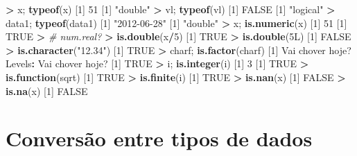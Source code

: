 \documentclass[]{book}
\newenvironment{Shaded}{\begin{snugshade}}{\end{snugshade}}
\newcommand{\KeywordTok}[1]{\textcolor[rgb]{0.13,0.29,0.53}{\textbf{#1}}}
\newcommand{\DecValTok}[1]{\textcolor[rgb]{0.00,0.00,0.81}{#1}}
\newcommand{\StringTok}[1]{\textcolor[rgb]{0.31,0.60,0.02}{#1}}
\newcommand{\CommentTok}[1]{\textcolor[rgb]{0.56,0.35,0.01}{\textit{#1}}}
\newcommand{\OtherTok}[1]{\textcolor[rgb]{0.56,0.35,0.01}{#1}}
\newcommand{\OperatorTok}[1]{\textcolor[rgb]{0.81,0.36,0.00}{\textbf{#1}}}
\newcommand{\ErrorTok}[1]{\textcolor[rgb]{0.64,0.00,0.00}{\textbf{#1}}}
\newcommand{\NormalTok}[1]{#1}
\begin{document}
\begin{Shaded}
\begin{Highlighting}[]
\OperatorTok{>}\StringTok{ }\NormalTok{x; }\KeywordTok{typeof}\NormalTok{(x)}
\NormalTok{[}\DecValTok{1}\NormalTok{] }\DecValTok{51}
\NormalTok{[}\DecValTok{1}\NormalTok{] }\StringTok{"double"}
\OperatorTok{>}\StringTok{ }\NormalTok{vl; }\KeywordTok{typeof}\NormalTok{(vl)}
\NormalTok{[}\DecValTok{1}\NormalTok{] }\OtherTok{FALSE}
\NormalTok{[}\DecValTok{1}\NormalTok{] }\StringTok{"logical"}
\OperatorTok{>}\StringTok{ }\NormalTok{data1; }\KeywordTok{typeof}\NormalTok{(data1)}
\NormalTok{[}\DecValTok{1}\NormalTok{] }\StringTok{"2012-06-28"}
\NormalTok{[}\DecValTok{1}\NormalTok{] }\StringTok{"double"}
\OperatorTok{>}\StringTok{ }\NormalTok{x; }\KeywordTok{is.numeric}\NormalTok{(x)}
\NormalTok{[}\DecValTok{1}\NormalTok{] }\DecValTok{51}
\NormalTok{[}\DecValTok{1}\NormalTok{] }\OtherTok{TRUE}
\OperatorTok{>}\StringTok{ }\CommentTok{#  num.real?}
\ErrorTok{>}\StringTok{ }\KeywordTok{is.double}\NormalTok{(x}\OperatorTok{/}\DecValTok{5}\NormalTok{)}
\NormalTok{[}\DecValTok{1}\NormalTok{] }\OtherTok{TRUE}
\OperatorTok{>}\StringTok{ }\KeywordTok{is.double}\NormalTok{(5L)}
\NormalTok{[}\DecValTok{1}\NormalTok{] }\OtherTok{FALSE}
\OperatorTok{>}\StringTok{ }\KeywordTok{is.character}\NormalTok{(}\StringTok{"12.34"}\NormalTok{)}
\NormalTok{[}\DecValTok{1}\NormalTok{] }\OtherTok{TRUE}
\OperatorTok{>}\StringTok{ }\NormalTok{charf; }\KeywordTok{is.factor}\NormalTok{(charf)}
\NormalTok{[}\DecValTok{1}\NormalTok{] Vai chover hoje?}
\NormalTok{Levels}\OperatorTok{:}\StringTok{ }\NormalTok{Vai chover hoje?}
\NormalTok{[}\DecValTok{1}\NormalTok{] }\OtherTok{TRUE}
\OperatorTok{>}\StringTok{ }\NormalTok{i; }\KeywordTok{is.integer}\NormalTok{(i)}
\NormalTok{[}\DecValTok{1}\NormalTok{] }\DecValTok{3}
\NormalTok{[}\DecValTok{1}\NormalTok{] }\OtherTok{TRUE}
\OperatorTok{>}\StringTok{ }\KeywordTok{is.function}\NormalTok{(sqrt)}
\NormalTok{[}\DecValTok{1}\NormalTok{] }\OtherTok{TRUE}
\OperatorTok{>}\StringTok{ }\KeywordTok{is.finite}\NormalTok{(i)}
\NormalTok{[}\DecValTok{1}\NormalTok{] }\OtherTok{TRUE}
\OperatorTok{>}\StringTok{ }\KeywordTok{is.nan}\NormalTok{(x)}
\NormalTok{[}\DecValTok{1}\NormalTok{] }\OtherTok{FALSE}
\OperatorTok{>}\StringTok{ }\KeywordTok{is.na}\NormalTok{(x)}
\NormalTok{[}\DecValTok{1}\NormalTok{] }\OtherTok{FALSE}
\end{Highlighting}
\end{Shaded}

\section{Conversão entre tipos de
dados}\label{conversao-entre-tipos-de-dados}
\end{document}
